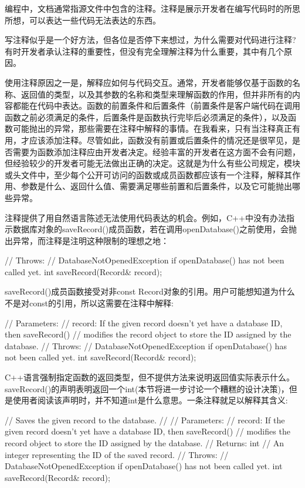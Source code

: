 
编程中，文档通常指源文件中包含的注释。注释是展示开发者在编写代码时的所思所想，可以表达一些代码无法表达的东西。


写注释似乎是一个好方法，但各位是否停下来想过，为什么需要对代码进行注释?有时开发者承认注释的重要性，但没有完全理解注释为什么重要，其中有几个原因。


使用注释原因之一是，解释应如何与代码交互。通常，开发者能够仅基于函数的名称、返回值的类型，以及其参数的名称和类型来理解函数的作用，但并非所有的内容都能在代码中表达。函数的前置条件和后置条件（前置条件是客户端代码在调用函数之前必须满足的条件，后置条件是函数执行完毕后必须满足的条件），以及函数可能抛出的异常，那些需要在注释中解释的事情。在我看来，只有当注释真正有用，才应该添加注释。尽管如此，函数没有前置或后置条件的情况还是很罕见，是否需要为函数添加注释应由开发者决定。经验丰富的开发者在这方面不会有问题，但经验较少的开发者可能无法做出正确的决定。这就是为什么有些公司规定，模块或头文件中，至少每个公开可访问的函数或成员函数都应该有一个注释，解释其作用、参数是什么、返回什么值、需要满足哪些前置和后置条件，以及它可能抛出哪些异常。

注释提供了用自然语言陈述无法使用代码表达的机会。例如，C++中没有办法指示数据库对象的saveRecord()成员函数，若在调用openDatabase()之前使用，会抛出异常，而注释是注明这种限制的理想之地：

\begin{cpp}
// Throws:
//    DatabaseNotOpenedException if openDatabase() has not been called yet.
int saveRecord(Record& record);
\end{cpp}

saveRecord()成员函数接受对非const Record对象的引用。用户可能想知道为什么不是对const的引用，所以这需要在注释中解释:

\begin{cpp}
// Parameters:
//    record: If the given record doesn't yet have a database ID, then saveRecord()
//    modifies the record object to store the ID assigned by the database.
// Throws:
//    DatabaseNotOpenedException if openDatabase() has not been called yet.
int saveRecord(Record& record);
\end{cpp}

C++语言强制指定函数的返回类型，但不提供方法来说明返回值实际表示什么。saveRecord()的声明表明返回一个int(本节将进一步讨论一个糟糕的设计决策)，但是使用者阅读该声明时，并不知道int是什么意思。一条注释就足以解释其含义:

\begin{cpp}
// Saves the given record to the database.
//
// Parameters:
//    record: If the given record doesn't yet have a database ID, then saveRecord()
//    modifies the record object to store the ID assigned by the database.
// Returns: int
//    An integer representing the ID of the saved record.
// Throws:
//    DatabaseNotOpenedException if openDatabase() has not been called yet.
int saveRecord(Record& record);
\end{cpp}

